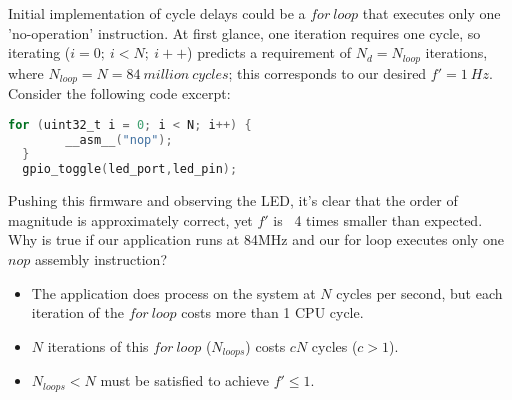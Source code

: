 \documentclass[a4paper,12pt]{article}   	%
\begin{document}
\large
\begin{flushleft}
Initial implementation of cycle delays could be a 
$for\ loop$ that executes only one 'no-operation' instruction. At first 
glance, one iteration requires one cycle, so iterating ($i = 0;\ i < N;\ i++$)
predicts a requirement of $N_d = N_{loop}$ iterations, where $N_{loop} = N = 84\ million\ cycles$;
this corresponds to our desired $f'= 1\ Hz$.\\[2 ex] 

Consider the following code excerpt:\\[1 ex] 

\begin{lstlisting}[backgroundcolor = \color{beige},
                    language = C,
                    xleftmargin = 2cm,
                    framexleftmargin = 1em]
  for (uint32_t i = 0; i < N; i++) {
        __asm__("nop");
  }
  gpio_toggle(led_port,led_pin);
  \end{lstlisting}



Pushing this firmware and
observing the LED, it's clear that the order of magnitude is approximately correct, 
yet $f'$ is ~4 times smaller than expected. Why is true 
if our application runs at 84MHz and our for loop executes only one $nop$ assembly instruction?\\[1 ex]

\end{flushleft}
\begin{itemize}
\setlength{\itemindent}{0.4in}
    \item The application does process on the system at $N$ cycles per second, 
    but each iteration of the $for\ loop$ costs more than 1 CPU cycle. 
    \item $N$ iterations of this $for\ loop$ ($N_{loops}$) costs $cN$ cycles ($c > 1$).
    \item $N_{loops} < N$ must be satisfied to achieve $f' \le 1.$
\end{itemize}
\end{document}
